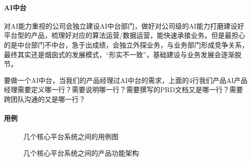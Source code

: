 \documentclass[letterpaper,10pt,english]{sphinxmanual}
\begin{document}
\paragraph{AI中台}
\label{\detokenize{chapter_introduction/platform:id6}}
对AI能力重视的公司会独立建设AI中台部门，做好对公司级的AI能力打磨建设好平台型的产品，梳理好对应的算法运营/数据运营，能快速承接业务。但是最担心的是中台部门不中台，急于出成绩，会独立外探业务，与业务部门形成竞争关系，最终其实还是烟囱式的发展模式，“形实不一致”，基础建设与业务发展会逐渐脱节。%
\begin{footnote}[132]\sphinxAtStartFootnote
{}
%
\end{footnote}


要做一个AI中台，当我们的产品经理过AI中台的需求，上面的4行我们产品AI产品经理需要定义哪一行？需要说明哪一行？需要撰写的PRD文档又是哪一行？需要跨团队沟通的又是哪一行？%
\begin{footnote}[133]\sphinxAtStartFootnote
{}
%
\end{footnote}



\paragraph{用例}
\label{\detokenize{chapter_introduction/platform:id7}}
\begin{figure}[H]
\centering
\capstart

\noindent{}
\caption{几个核心平台系统之间的用例图\sphinxfootnotemark[134]}\label{\detokenize{chapter_introduction/platform:id15}}\end{figure}
%
\begin{footnotetext}[134]\sphinxAtStartFootnote
{}
%
\end{footnotetext}\ignorespaces 
\begin{figure}[H]
\centering
\capstart

\noindent{}
\caption{几个核心平台系统之间的产品功能架构}\label{\detokenize{chapter_introduction/platform:id16}}\end{figure}
\end{document}
